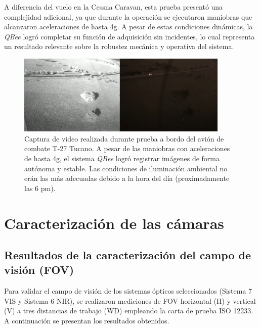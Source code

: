     \noindent A diferencia del vuelo en la Cessna Caravan, esta prueba presentó una complejidad adicional, ya que durante la operación se ejecutaron maniobras que alcanzaron aceleraciones de hasta 4g. A pesar de estas condiciones dinámicas, la \textit{QBee} logró completar su función de adquisición sin incidentes, lo cual representa un resultado relevante sobre la robustez mecánica y operativa del sistema.
    
    \begin{figure}[!h]
    \centering
    \includegraphics[width=0.9\textwidth]{Figures/C4/t2.png}
    \caption{Captura de video realizada durante prueba a bordo del avión de combate T-27 Tucano. A pesar de las maniobras con aceleraciones de hasta 4g, el sistema \textit{QBee} logró registrar imágenes de forma autónoma y estable. Las condiciones de iluminación ambiental no erán las más adecuadas debido a la hora del día (proximadamente las 6 pm).}
    \label{fig:prueba_tucano}
    \end{figure}
    

\section{Caracterización de las cámaras}
    \subsection{Resultados de la caracterización del campo de visión (FOV)}
    \label{sec:fov_resultados}
    
    Para validar el campo de visión de los sistemas ópticos seleccionados (Sistema 7 VIS y Sistema 6 NIR), se realizaron mediciones de FOV horizontal (H) y vertical (V) a tres distancias de trabajo (\(\mathrm{WD}\)) empleando la carta de prueba ISO 12233. A continuación se presentan los resultados obtenidos.\\
    
